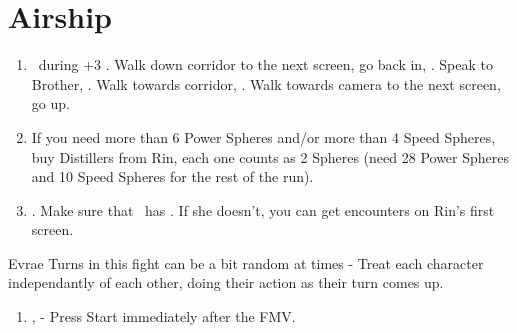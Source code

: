 \chapter{Airship}

\begin{enumerate}
    \item \sd\ during \cs+3 \skippablefmv. Walk down corridor to the next screen, go back in, \sd. Speak to Brother, \sd. Walk towards corridor, \sd. Walk towards camera to the next screen, go up.
    \item If you need more than 6 Power Spheres and/or more than 4 Speed Spheres, buy Distillers from Rin, each one counts as 2 Spheres (need 28 Power Spheres and 10 Speed Spheres for the rest of the run).
    \item \save. Make sure that \rikku\ has \od. If she doesn't, you can get encounters on Rin's first screen.
\end{enumerate}
\begin{battle}[32000]{Evrae}
    Turns in this fight can be a bit random at times - Treat each character independantly of each other, doing their action as their turn comes up.
    \begin{itemize}
    \end{itemize}
\end{battle}
\begin{enumerate}[resume]
    \item \sd, \skippablefmv[3:00] - Press Start immediately after the FMV.
\end{enumerate}